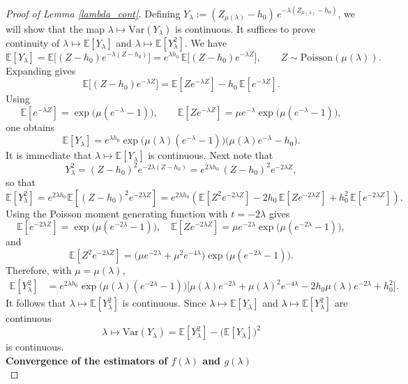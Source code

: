 \documentclass[12pt]{article}
\numberwithin{equation}{section}
\begin{document}
\begin{proof}[Proof of Lemma \ref{lambda_cont}]
Defining $Y_\lambda := (Z_{\mu(\lambda)}-h_0)\,e^{-\lambda(Z_{\mu(\lambda)}-h_0)}$, we will show that the map $
\lambda \mapsto \mathrm{Var}(Y_\lambda)
$
is continuous. It suffices to prove continuity of $\lambda\mapsto \mathbb{E}[Y_\lambda]$
and $\lambda\mapsto \mathbb{E}[Y_\lambda^2]$. We have
\[
\mathbb{E}[Y_\lambda]
=\mathbb{E}\Big[(Z-h_0)e^{-\lambda(Z-h_0)}\Big]
= e^{\lambda h_0}\,\mathbb{E}\Big[(Z-h_0)e^{-\lambda Z}\Big],
\qquad Z\sim \mathrm{Poisson}(\mu(\lambda)).
\]
Expanding gives
\[
\mathbb{E}\Big[(Z-h_0)e^{-\lambda Z}\Big]
=\mathbb{E}[Z e^{-\lambda Z}] - h_0\,\mathbb{E}[e^{-\lambda Z}].
\]
Using
\[
\mathbb{E}[e^{-\lambda Z}]=\exp\!\big(\mu(e^{-\lambda}-1)\big),
\qquad
\mathbb{E}[Z e^{-\lambda Z}]
=\mu e^{-\lambda}\exp\!\big(\mu(e^{-\lambda}-1)\big),
\]
one obtains
\[
\mathbb{E}[Y_\lambda]
= e^{\lambda h_0}\exp\!\big(\mu(\lambda)(e^{-\lambda}-1)\big)\Big(\mu(\lambda)e^{-\lambda}-h_0\Big).
\]
It is immediate that
$\lambda\mapsto \mathbb{E}[Y_\lambda]$ is continuous. Next note that
\[
Y_\lambda^2 = (Z-h_0)^2 e^{-2\lambda(Z-h_0)}
= e^{2\lambda h_0}\,(Z-h_0)^2 e^{-2\lambda Z},
\]
so that
\[
\mathbb{E}[Y_\lambda^2]
= 
e^{2\lambda h_0}\mathbb{E}[(Z-h_0)^2 e^{-2\lambda Z}]
=e^{2\lambda h_0}(\mathbb{E}[Z^2 e^{-2\lambda Z}]
-2h_0\,\mathbb{E}[Z e^{-2\lambda Z}]
+h_0^2\,\mathbb{E}[e^{-2\lambda Z}]).
\]
Using the Poisson moment generating function with $t=-2\lambda$ gives
\[
\mathbb{E}[e^{-2\lambda Z}]
=\exp\!\big(\mu(e^{-2\lambda}-1)\big),
\quad
\mathbb{E}[Z e^{-2\lambda Z}]
=\mu e^{-2\lambda}\exp\!\big(\mu(e^{-2\lambda}-1)\big),
\]
and
\[
\mathbb{E}[Z^2 e^{-2\lambda Z}]
=\big(\mu e^{-2\lambda}+\mu^2 e^{-4\lambda}\big)\exp\!\big(\mu(e^{-2\lambda}-1)\big).
\]
Therefore, with $\mu=\mu(\lambda)$,
\begin{align*}
\mathbb{E}[Y_\lambda^2]
&= e^{2\lambda h_0}\exp\!\big(\mu(\lambda)(e^{-2\lambda}-1)\big)
\Big[
\mu(\lambda)e^{-2\lambda}
+\mu(\lambda)^2 e^{-4\lambda}
-2h_0\mu(\lambda)e^{-2\lambda}
+h_0^2
\Big].
\end{align*}
It follows that $\lambda\mapsto \mathbb{E}[Y_\lambda^2]$ is continuous.
Since $\lambda\mapsto \mathbb{E}[Y_\lambda]$ and $\lambda\mapsto \mathbb{E}[Y_\lambda^2]$
are continuous
\[
\lambda\mapsto \mathrm{Var}(Y_\lambda)
=\mathbb{E}[Y_\lambda^2]-\big(\mathbb{E}[Y_\lambda]\big)^2
\]
is continuous.\\

\textbf{Convergence of the estimators of $f(\lambda)$ and $g(\lambda)$}\\




\end{proof}
\end{document}
